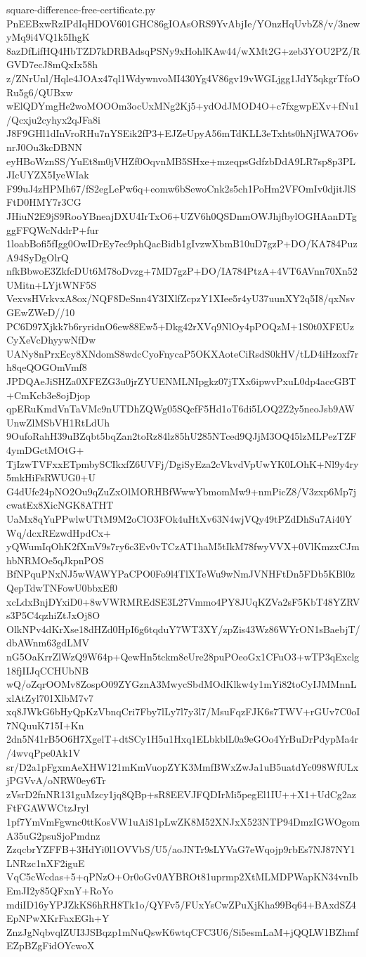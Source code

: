\documentclass[11pt]{article}
\theoremstyle{definition}
\theoremstyle{remark}
\begin{document}
\begin{filecontents*}[overwrite]{square-difference-free-certificate.py}
PnEEBxwRzIPdIqHDOV601GHC86gIOAsORS9YvAbjIe/YOnzHqUvbZ8/v/3newyMq9i4VQ1k5IhgK
8azDfLifHQ4HbTZD7kDRBAdsqPSNy9xHohlKAw44/wXMt2G+zeb3YOU2PZ/RGVD7ecJ8mQxIx58h
z/ZNrUnl/Hqle4JOAx47ql1WdywnvoMI430Yg4V86gv19vWGLjgg1JdY5qkgrTfoORu5g6/QUBxw
wElQDYmgHe2woMOOOm3ocUxMNg2Kj5+ydOdJMOD4O+c7fxgwpEXv+fNu1/Qcxju2cyhyx2qJFa8i
J8F9GHl1dInVroRHu7nYSEik2fP3+EJZeUpyA56mTdKLL3eTxhts0hNjIWA7O6vnrJ0Ou3kcDBNN
eyHBoWznSS/YuEt8m0jVHZf0OqvnMB5SHxe+mzeqpsGdfzbDdA9LR7sp8p3PLJIcUYZX5IyeWIak
F99uJ4zHPMh67/fS2egLePw6q+eomw6bSewoCnk2s5ch1PoHm2VFOmIv0djitJlSFtD0HMY7r3CG
JHiuN2E9jS9RooYBneajDXU4IrTxO6+UZV6h0QSDnmOWJhjfbylOGHAanDTgggFFQWcNddrP+fur
1loabBofi5fIgg0OwIDrEy7ec9phQacBidb1gIvzwXbmB10uD7gzP+DO/KA784PuzA94SyDgOlrQ
nfkBbwoE3ZkfcDUt6M78oDvzg+7MD7gzP+DO/IA784PtzA+4VT6AVnn70Xn52UMitn+LYjtWNF5S
VexvsHVrkvxA8ox/NQF8DeSnn4Y3IXlfZcpzY1XIee5r4yU37uunXY2q5I8/qxNsvGEwZWeD//10
PC6D97Xjkk7b6ryridnO6ew88Ew5+Dkg42rXVq9NlOy4pPOQzM+1S0t0XFEUzCyXeVcDhyywNfDw
UANy8nPrxEcy8XNdomS8wdcCyoFnycaP5OKXAoteCiRsdS0kHV/tLD4iHzoxf7rh8qeQOGOmVmf8
JPDQAeJiSHZa0XFEZG3u0jrZYUENMLNIpgkz07jTXx6ipwvPxuL0dp4accGBT+CmKcb3e8ojDjop
qpERuKmdVnTaVMc9nUTDhZQWg05SQcfF5Hd1oT6di5LOQ2Z2y5neoJsb9AWUnwZlMSbVH1RtLdUh
9OufoRahH39uBZqbt5bqZan2toRz84lz85hU285NTced9QJjM3OQ45lzMLPezTZF4ymDGctMOtG+
TjIzwTVFxxETpmbySCIkxfZ6UVFj/DgiSyEza2cVkvdVpUwYK0LOhK+Nl9y4ry5mkHiFsRWUG0+U
G4dUfe24pNO2Ou9qZuZxOlMORHBfWwwYbmomMw9+nmPicZ8/V3zxp6Mp7jcwatEx8XicNGK8ATHT
UaMx8qYuPPwlwUTtM9M2oClO3FOk4uHtXv63N4wjVQy49tPZdDhSu7Ai40YWq/dcxREzwdHpdCx+
yQWumIqOhK2fXmV9s7ry6c3Ev0vTCzAT1haM5tIkM78fwyVVX+0VlKmzxCJmhbNRMOe5qJkpnPOS
BfNPquPNxNJ5wWAWYPaCPO0Fo9l4TlXTeWu9wNmJVNHFtDn5FDb5KBl0zQepTdwTNFowU0bbxEf0
xcLdxBnjDYxiD0+8wVWRMREdSE3L27Vmmo4PY8JUqKZVa2sF5KbT48YZRVs3P5C4qzhiZtJxOj8O
OlkNPv4dKrXse18dHZd0HpI6g6tqduY7WT3XY/zpZis43Wz86WYrON1sBaebjT/dbAWnm63gdLMV
nG5OaKrrZlWzQ9W64p+QewHn5tckm8eUre28puPOeoGx1CFuO3+wTP3qExclg18fjIIJqCCHUbNB
wQ/oZqrOOMv8ZospO09ZYGznA3MwycSbdMOdKlkw4y1mYi82toCyIJMMnnLxlAtZyl701XlbM7v7
xq8JWkG6bHyQpKzVbnqCri7Fby7lLy7l7y3l7/MsuFqzFJK6s7TWV+rGUv7C0oI7NQuuK715I+Kn
2dn5N41rB5O6H7XgelT+dtSCy1H5u1Hxq1ELbkblL0a9eGOo4YrBuDrPdypMa4r/4wvqPpe0Ak1V
sr/D2a1pFgxmAeXHW121mKmVuopZYK3MmfBWxZwJa1uB5uatdYc098WfULxjPGVvA/oNRW0ey6Tr
zVsrD2fnNR131guMzcy1jq8QBp+sR8EEVJFQDIrMi5pegEl1IU++X1+UdCg2azFtFGAWWCtzJryl
1pf7YmVmFgwnc0ttKosVW1uAiS1pLwZK8M52XNJxX523NTP94DmzIGWOgomA35uG2psuSjoPmdnz
ZzqcbrYZFFB+3HdYi0l1OVVbS/U5/aoJNTr9sLYVaG7eWqojp9rbEs7NJ87NY1LNRzc1nXF2iguE
VqC5cWcdas+5+qPNzO+Or0oGv0AYBROt81uprmp2XtMLMDPWapKN34vnIbEmJI2y85QFxnY+RoYo
mdiID16yYPJZkKS6hRH8Tk1o/QYFv5/FUxYsCwZPuXjKha99Bq64+BAxdSZ4EpNPwXKrFaxEGh+Y
ZnzJgNqbvqlZUI3JSBqzp1mNuQswK6wtqCFC3U6/Si5esmLaM+jQQLW1BZhmfEZpBZgFidOYcwoX

\end{filecontents*}
\end{document}
